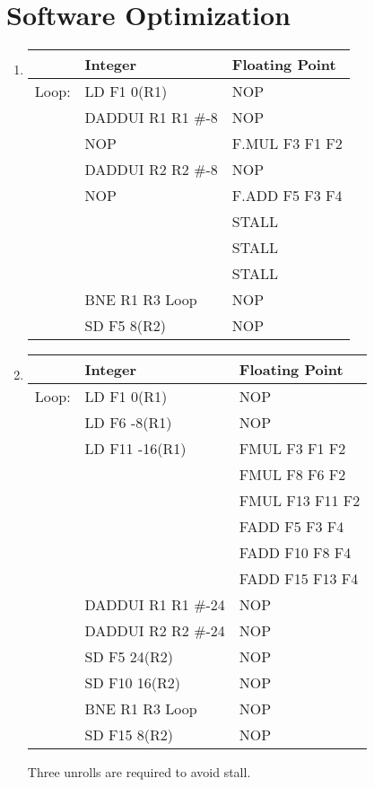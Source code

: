 \documentclass{article}
\begin{document}
    \section{Software Optimization}
    \begin{enumerate}
    \item \begin{tabular}{l l l}
    \hline
    & Integer & Floating Point \\
    \hline 
    Loop: & LD F1 0(R1) & NOP \\
	& DADDUI R1 R1 \#-8 & NOP \\
	& NOP & F.MUL F3 F1 F2 \\
	& DADDUI R2 R2 \#-8 & NOP \\
	& NOP & F.ADD F5 F3 F4 \\
	& & STALL \\
	& & STALL \\
	& & STALL \\
	& BNE R1 R3 Loop & NOP \\
	& SD F5 8(R2) & NOP\\
    \end{tabular}
    \item \begin{tabular} {l l l}
    \hline
    & Integer & Floating Point \\
    \hline
    Loop: & LD F1 0(R1) & NOP \\
    & LD F6 -8(R1) & NOP \\
    & LD F11 -16(R1) & FMUL F3 F1 F2 \\
    & & FMUL F8 F6 F2 \\
    & & FMUL F13 F11 F2 \\
    & & FADD F5 F3 F4 \\
    & & FADD F10 F8 F4 \\
    & & FADD F15 F13 F4 \\
    & DADDUI R1 R1 \#-24 & NOP  \\
    & DADDUI R2 R2 \#-24 & NOP \\
    & SD F5 24(R2) & NOP \\
    & SD F10 16(R2) & NOP \\
    & BNE R1 R3 Loop & NOP \\
    &SD F15 8(R2) & NOP \\
    \hline
    \end{tabular}
    \newline Three unrolls are required to avoid stall.
    \end{enumerate}
\end{document}

